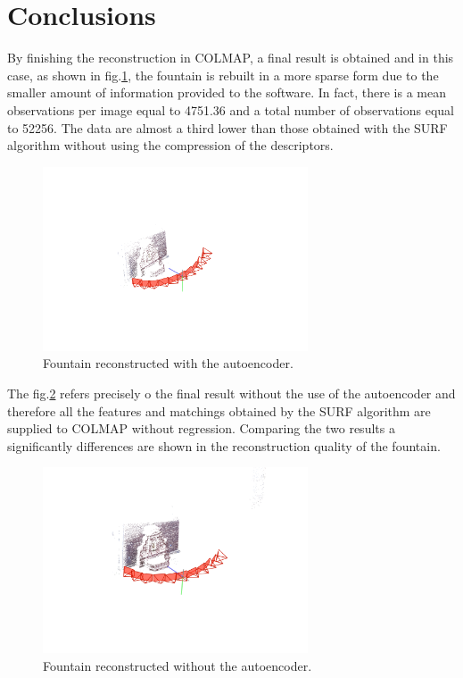 
\section{Conclusions}
By finishing the reconstruction in COLMAP, a final result is obtained and in this case, as shown in fig.\ref{fig:fountain}, the fountain is rebuilt in a more sparse form due to the smaller amount of information provided to the software. In fact, there is a mean observations per image equal to 4751.36 and a total number of observations equal to 52256. The data are almost a third lower than those obtained with the SURF algorithm without using the compression of the descriptors. 

\begin{figure}[h!]
    \centering
    \includegraphics[width=0.7\textwidth]{images/fountain.png}
    \caption{Fountain reconstructed with the autoencoder.}
    \label{fig:fountain}    
\end{figure}

The fig.\ref{fig:fountain1} refers precisely o the final result without the use of the autoencoder and therefore all the features and matchings obtained by the SURF algorithm are supplied to COLMAP without regression. Comparing the two results a significantly differences are shown in the reconstruction quality of the fountain.

\begin{figure}[h!]
    \centering
    \includegraphics[width=0.7\textwidth]{images/fountain1.png}  
    \caption{Fountain reconstructed without the autoencoder.}
    \label{fig:fountain1}    
\end{figure}